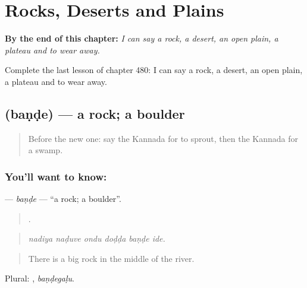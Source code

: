 
\chapter{Rocks, Deserts and Plains}
\label{ch:ka-rocks-deserts-and-plains}

\begin{chapteropening}
\textbf{By the end of this chapter:} \emph{I can say a rock, a desert, an open plain, a plateau and to wear away.}

Complete the last lesson of chapter 480: I can say a rock, a desert, an open plain, a plateau and to wear away.
\end{chapteropening}

\section[\texorpdfstring{\kn{ಬಂಡೆ} (baṇḍe)}{ಬಂಡೆ (baṇḍe)}]{ (baṇḍe) — a rock; a boulder}

\label{lesson:KA-C480-bande}



\begin{quote}
Before the new one: say the Kannada for to sprout, then the Kannada for a swamp.
\end{quote}

\subsection*{You'll want to know: }
\textbf{} — \emph{baṇḍe} — \textquotedblleft{}a rock; a boulder\textquotedblright{}.

\begin{quote}
     .
\end{quote}

\begin{quote}
\emph{nadiya naḍuve ondu doḍḍa baṇḍe ide.}
\end{quote}

\begin{quote}
There is a big rock in the middle of the river.
\end{quote}

Plural: , \emph{baṇḍegaḷu}.


